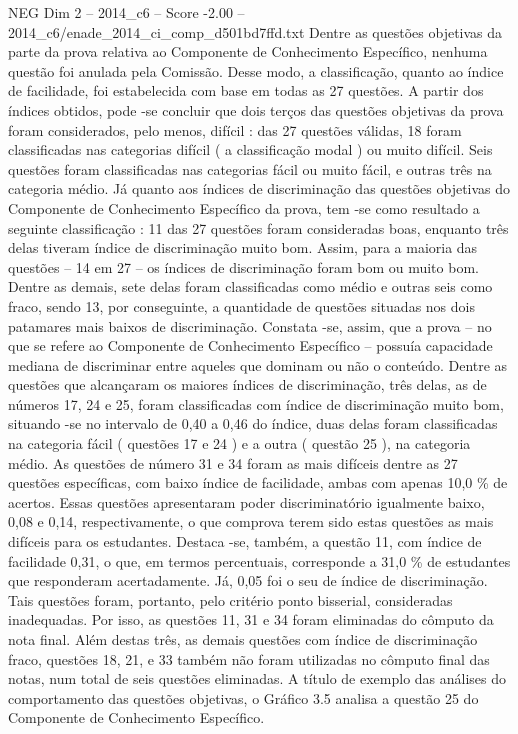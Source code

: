 \begin{textsample}{NEG Dim 2 – 2014\_c6 – Score -2.00 – 2014\_c6/enade\_2014\_ci\_comp\_d501bd7ffd.txt}
Dentre as questões objetivas da parte da prova relativa ao Componente de Conhecimento Específico, nenhuma questão foi anulada pela Comissão.
Desse modo, a classificação, quanto ao índice de facilidade, foi estabelecida com base em todas as 27 questões.
A partir dos índices obtidos, pode -se concluir que dois terços das questões objetivas da prova foram considerados, pelo menos, difícil : das 27 questões válidas, 18 foram classificadas nas categorias difícil ( a classificação modal ) ou muito difícil.
Seis questões foram classificadas nas categorias fácil ou muito fácil, e outras três na categoria médio.
Já quanto aos índices de discriminação das questões objetivas do Componente de Conhecimento Específico da prova, tem -se como resultado a seguinte classificação : 11 das 27 questões foram consideradas boas, enquanto três delas tiveram índice de discriminação muito bom.
Assim, para a maioria das questões – 14 em 27 – os índices de discriminação foram bom ou muito bom.
Dentre as demais, sete delas foram classificadas como médio e outras seis como fraco, sendo 13, por conseguinte, a quantidade de questões situadas nos dois patamares mais baixos de discriminação.
Constata -se, assim, que a prova – no que se refere ao Componente de Conhecimento Específico – possuía capacidade mediana de discriminar entre aqueles que dominam ou não o conteúdo.
Dentre as questões que alcançaram os maiores índices de discriminação, três delas, as de números 17, 24 e 25, foram classificadas com índice de discriminação muito bom, situando -se no intervalo de 0,40 a 0,46 do índice, duas delas foram classificadas na categoria fácil ( questões 17 e 24 ) e a outra ( questão 25 ), na categoria médio.
As questões de número 31 e 34 foram as mais difíceis dentre as 27 questões específicas, com baixo índice de facilidade, ambas com apenas 10,0 \% de acertos.
Essas questões apresentaram poder discriminatório igualmente baixo, 0,08 e 0,14, respectivamente, o que comprova terem sido estas questões as mais difíceis para os estudantes.
Destaca -se, também, a questão 11, com índice de facilidade 0,31, o que, em termos percentuais, corresponde a 31,0 \% de estudantes que responderam acertadamente.
Já, 0,05 foi o seu de índice de discriminação.
Tais questões foram, portanto, pelo critério ponto bisserial, consideradas inadequadas.
Por isso, as questões 11, 31 e 34 foram eliminadas do cômputo da nota final.
Além destas três, as demais questões com índice de discriminação fraco, questões 18, 21, e 33 também não foram utilizadas no cômputo final das notas, num total de seis questões eliminadas.
A título de exemplo das análises do comportamento das questões objetivas, o Gráfico 3.5 analisa a questão 25 do Componente de Conhecimento Específico.

\end{textsample}
